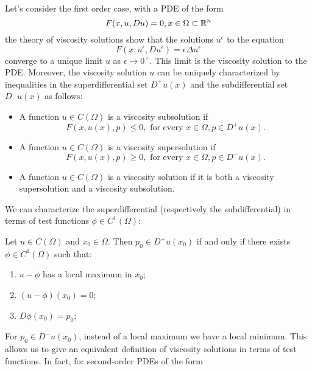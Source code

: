  Let's consider the first order case, with a PDE of the form
 \begin{equation*}
    F(x,u, D u) = 0, x \in \Omega \subset \mathbb{R}^n
 \end{equation*}
the theory of viscosity solutions show that the solutions $u^\epsilon$
to the equation
\begin{equation*}
    F(x, u^\epsilon, D u^\epsilon) = \epsilon \Delta u^\epsilon
\end{equation*}
converge to a unique limit $u$ as $\epsilon \to 0^+$.
This limit is the viscosity solution to the PDE.
Moreover, the viscosity solution $u$ can be uniquely characterized by inequalities
in the superdifferential set $D^+ u(x)$ and the subdifferential set $D^- u(x)$
as follows:
\begin{itemize}
    \item A function $u \in C(\Omega)$ is a viscosity subsolution if
\begin{equation*}
    F(x, u(x), p) \leq 0, \text{ for every } x \in \Omega, p \in D^+ u(x).
\end{equation*}
    \item A function $u \in C(\Omega)$ is a viscosity supersolution if
\begin{equation*}
    F(x, u(x), p) \geq 0, \text{ for every } x \in \Omega, p \in D^- u(x).
\end{equation*}
    \item A function $u \in C(\Omega)$ is a viscosity solution if it is both
    a viscosity supersolution and a viscosity subsolution.
\end{itemize}
We can characterize the superdifferential (respectively the subdifferential) in
terms of test functions $\phi \in C^1(\Omega)$:
\begin{definition}
    Let $u \in C(\Omega)$ and $x_0 \in \Omega$. Then $p_0  \in D^+ u(x_0)$ if and 
    only if there exists $\phi \in C^1(\Omega)$ such that:
\begin{enumerate}
    \item $u - \phi$ has a local maximum in $x_0$;
    \item $(u - \phi)(x_0) = 0$;
    \item $D \phi(x_0) = p_0$;
\end{enumerate}
\end{definition}
For $p_0 \in D^- u(x_0)$, instead of a local maximum we have a local minimum.
This allows us to give an equivalent definition of viscosity solutions in terms 
of test functions. In fact, for second-order PDEs
of the form

